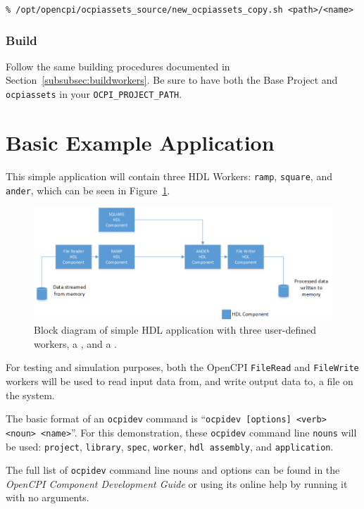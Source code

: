 \verb+% /opt/opencpi/ocpiassets_source/new_ocpiassets_copy.sh <path>/<name>+

\subsubsection{Build}
Follow the same building procedures documented in Section~\ref{subsubsec:buildworkers}. Be sure to have both the Base Project and \texttt{ocpiassets} in your \verb+OCPI_PROJECT_PATH+.

\newpage
\section{Basic Example Application}
\label{sec:basic_example}
This simple application will contain three HDL Workers: \verb+ramp+, \verb+square+, and \verb+ander+, which can be seen in Figure~\ref{fig:simple_app_diagram}. \newline

\begin{figure}[h]
        \centering
        \includegraphics[scale=0.5]{./figures/simple_app_block_diagram.png}
        \caption{Block diagram of simple HDL application with three user-defined workers, a , and a .}
        \label{fig:simple_app_diagram}
\end{figure}
For testing and simulation purposes, both the OpenCPI \verb+FileRead+ and \verb+FileWrite+ workers will be used to read input data from, and write output data to, a file on the system.\newline

The basic format of an \verb+ocpidev+ command is ``\verb+ocpidev [options] <verb> <noun> <name>+''. For this demonstration, these \verb+ocpidev+ command line \verb+nouns+ will be used: \verb+project+, \verb+library+, \verb+spec+, \verb+worker+, \verb+hdl assembly+, and \verb+application+.\newline

The full list of \verb+ocpidev+ command line nouns and options can be found in the \textit{OpenCPI Component Development Guide} or using its online help by running it with no arguments.

